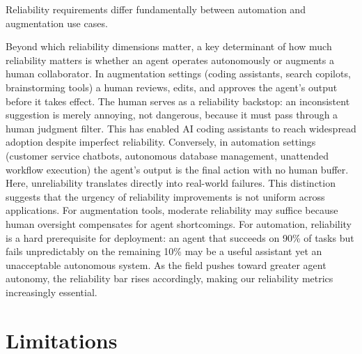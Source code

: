 \documentclass[11pt]{article}
\newcounter{dimension}
\begin{document}
\begin{claimbox}
Reliability requirements differ fundamentally between automation and augmentation use cases.
\end{claimbox}
Beyond which reliability dimensions matter, a key determinant of how much reliability matters is whether an agent operates autonomously or augments a human collaborator. In augmentation settings (coding assistants, search copilots, brainstorming tools) a human reviews, edits, and approves the agent's output before it takes effect. The human serves as a reliability backstop: an inconsistent suggestion is merely annoying, not dangerous, because it must pass through a human judgment filter. This has enabled AI coding assistants to reach widespread adoption despite imperfect reliability. Conversely, in automation settings (customer service chatbots, autonomous database management, unattended workflow execution) the agent's output is the final action with no human buffer. Here, unreliability translates directly into real-world failures. This distinction suggests that the urgency of reliability improvements is not uniform across applications. For augmentation tools, moderate reliability may suffice because human oversight compensates for agent shortcomings. For automation, reliability is a hard prerequisite for deployment: an agent that succeeds on 90\% of tasks but fails unpredictably on the remaining 10\% may be a useful assistant yet an unacceptable autonomous system. As the field pushes toward greater agent autonomy, the reliability bar rises accordingly, making our reliability metrics  increasingly essential.


\section{Limitations}
\label{sec:discussion}
\end{document}
